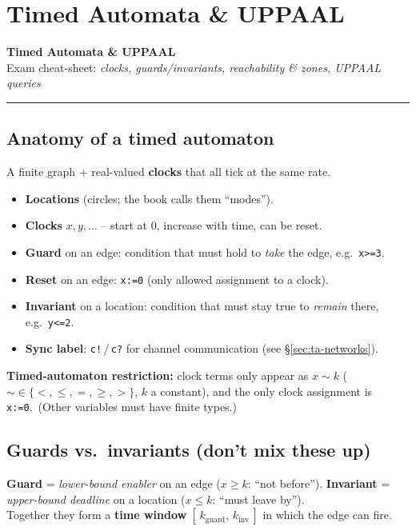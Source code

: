 \chapter{Timed Automata \& UPPAAL}


\begin{center}
{\Large\bfseries Timed Automata \& UPPAAL}\\[1pt]
{\small Exam cheat-sheet: \emph{clocks, guards/invariants, reachability \& zones, UPPAAL queries}}
\end{center}
\hrule
\vspace{4pt}

\section{Anatomy of a timed automaton}
A finite graph + real-valued \textbf{clocks} that all tick at the same rate.
\begin{itemize}
\item \textbf{Locations} (circles; the book calls them ``modes'').
\item \textbf{Clocks} $x,y,\dots$ -- start at 0, increase with time, can be reset.
\item \textbf{Guard} on an edge: condition that must hold to \emph{take} the edge, e.g.\ \texttt{x>=3}.
\item \textbf{Reset} on an edge: \texttt{x:=0} (only allowed assignment to a clock).
\item \textbf{Invariant} on a location: condition that must stay true to \emph{remain} there, e.g.\ \texttt{y<=2}.
\item \textbf{Sync label}: \texttt{c!}\,/\,\texttt{c?} for channel communication (see \S\ref{sec:ta-networks}).
\end{itemize}
\begin{keybox}
\textbf{Timed-automaton restriction:} clock terms only appear as $x\sim k$ ($\sim\in\{<,\le,=,\ge,>\}$, $k$ a constant), and the only clock assignment is \texttt{x:=0}.\ (Other variables must have finite types.)
\end{keybox}

\section{Guards vs.\ invariants (don't mix these up)}
\begin{keybox}
\textbf{Guard} = \emph{lower-bound enabler} on an edge ($x\ge k$: ``not before''). \quad
\textbf{Invariant} = \emph{upper-bound deadline} on a location ($x\le k$: ``must leave by''). \\
Together they form a \textbf{time window} $[\,k_{\text{guard}},\,k_{\text{inv}}\,]$ in which the edge can fire.
\end{keybox}

